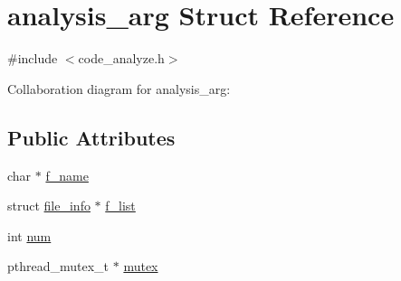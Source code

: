 \hypertarget{structanalysis__arg}{\section{analysis\+\_\+arg Struct Reference}
\label{structanalysis__arg}
}


{\ttfamily \#include $<$code\+\_\+analyze.\+h$>$}



Collaboration diagram for analysis\+\_\+arg\+:
\subsection*{Public Attributes}
\begin{DoxyCompactItemize}
\item 
char $\ast$ \hyperlink{structanalysis__arg_ae4dc80fc7340c819c3315324b1c24511}{f\+\_\+name}
\item 
struct \hyperlink{structfile__info}{file\+\_\+info} $\ast$ \hyperlink{structanalysis__arg_a06dce9c50b6212f9fd620d149adc5734}{f\+\_\+list}
\item 
int \hyperlink{structanalysis__arg_af120d208cb66f64281db9ccd6f2f6afc}{num}
\item 
pthread\+\_\+mutex\+\_\+t $\ast$ \hyperlink{structanalysis__arg_a5af66e583b346de25aee6ab4acaa91a7}{mutex}
\end{DoxyCompactItemize}


